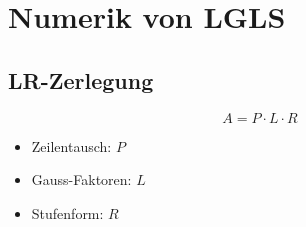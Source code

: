 \section{Numerik von LGLS}

\subsection{LR-Zerlegung}

\begin{displaymath}
	A = P \cdot L \cdot R
\end{displaymath}

\begin{itemize}
    \item Zeilentausch: $P$
    \item Gauss-Faktoren: $L$
    \item Stufenform: $R$
\end{itemize}